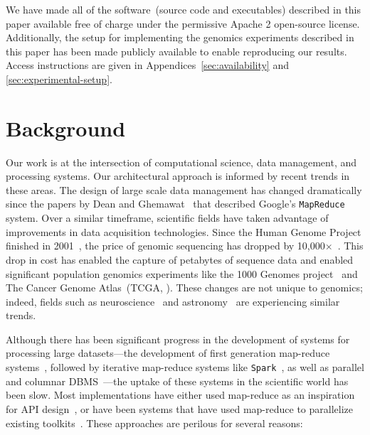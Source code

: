 \documentclass{sig-alternate}
\begin{document}
We have made all of the software~(source code and executables) described in this paper available free
of charge under the permissive Apache 2 open-source license. Additionally, the setup for implementing the
genomics experiments described in this paper has been made publicly available to enable reproducing our
results. Access instructions are given in Appendices~\ref{sec:availability} and \ref{sec:experimental-setup}.

\section{Background}
\label{sec:background}

Our work is at the intersection of computational science, data management, and processing
systems. Our architectural approach is informed by recent trends in these areas. The design of
large scale data management has changed dramatically since the papers by Dean and
Ghemawat~\cite{dean04, dean08} that described Google's \texttt{MapReduce} system. Over a
similar timeframe, scientific fields have taken advantage of improvements in data acquisition
technologies. Since the Human Genome Project finished in 2001~\cite{lander01}, the price
of genomic sequencing has dropped by 10,000$\times$~\cite{nhgri}. This drop in cost has enabled the
capture of petabytes of sequence data and enabled significant population genomics
experiments like the 1000 Genomes project~\cite{siva08} and The Cancer Genome Atlas~(TCGA,
\cite{weinstein13}). These changes are not unique to genomics; indeed, fields such as
neuroscience~\cite{cunningham14} and astronomy~\cite{lsst2008, turk11, sdss2000} are experiencing similar
trends.

Although there has been significant progress in the development of systems for processing large
datasets---the development of first generation map-reduce systems~\cite{dean04}, followed by
iterative map-reduce systems like \texttt{Spark}~\cite{zaharia10}, as well as parallel and columnar
DBMS~\cite{abadi06, lamb12}---the uptake of these systems in the scientific world has been slow.
Most implementations have either used map-reduce as an inspiration for API
design~\cite{mckenna10}, or have been systems that have used map-reduce to
parallelize existing toolkits~\cite{langmead09, schatz09}. These approaches are perilous for several
reasons:
\end{document}
